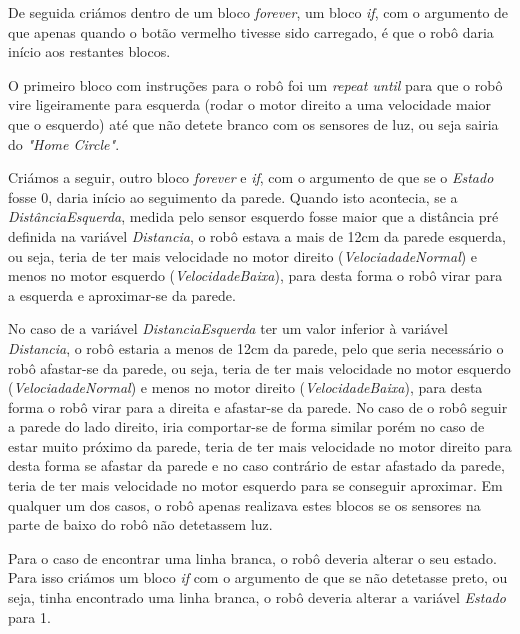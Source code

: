 \documentclass[pdftex,12pt,a4paper]{report}
\begin{document}
De seguida criámos dentro de um bloco \emph{forever}, um bloco \emph{if}, com o argumento de que apenas quando o botão vermelho tivesse sido carregado, é que o robô daria início aos restantes blocos.

O primeiro bloco com instruções para o robô foi um \emph{repeat until} para que o robô vire ligeiramente para esquerda (rodar o motor direito a uma velocidade maior que o esquerdo) até que não detete branco com os sensores de luz, ou seja sairia do \emph{"Home Circle"}.

Criámos a seguir, outro bloco \emph{forever} e \emph{if}, com o argumento de que se o \emph{Estado} fosse 0, daria início ao seguimento da parede. Quando isto acontecia, se a \emph{DistânciaEsquerda}, medida pelo sensor esquerdo fosse maior que a distância pré definida na variável \emph{Distancia}, o robô estava a mais de 12cm da parede esquerda, ou seja, teria de ter mais velocidade no motor direito (\emph{VelociadadeNormal}) e menos no motor esquerdo (\emph{VelocidadeBaixa}), para desta forma o robô virar para a esquerda e aproximar-se da parede. 

No caso de a variável \emph{DistanciaEsquerda} ter um valor inferior à variável \emph{Distancia}, o robô estaria a menos de 12cm da parede, pelo que seria necessário o robô afastar-se da parede, ou seja, teria de ter mais velocidade no motor esquerdo (\emph{VelociadadeNormal}) e menos no motor direito (\emph{VelocidadeBaixa}), para desta forma o robô virar para a direita e afastar-se da parede. No caso de o robô seguir a parede do lado direito, iria comportar-se de forma similar porém no caso de estar muito próximo da parede, teria de ter mais velocidade no motor direito para desta forma se afastar da parede e no caso contrário de estar afastado da parede, teria de ter mais velocidade no motor esquerdo para se conseguir aproximar. Em qualquer um dos casos, o robô apenas realizava estes blocos se os sensores na parte de baixo do robô não detetassem luz.

Para o caso de encontrar uma linha branca, o robô deveria alterar o seu estado. Para isso criámos um bloco \emph{if} com o argumento de que se não detetasse preto, ou seja, tinha encontrado uma linha branca, o robô deveria alterar a variável \emph{Estado} para 1.
\end{document}
